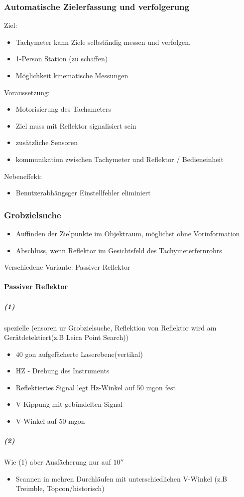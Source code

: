 \documentclass[12pt]{article}
\begin{document}
\subsubsection{Automatische Zielerfassung und verfolgerung}
Ziel:
\begin{itemize}
	\item Tachymeter kann Ziele selbständig messen und verfolgen.
	\item 1-Person Station (zu schaffen)
	\item Möglichkeit kinematische Messungen
\end{itemize}
Voraussetzung:
\begin{itemize}
	\item Motorisierung des Tachameters
	\item Ziel muss mit Reflektor signalisiert sein
	\item zusätzliche Sensoren
	\item kommunikation zwischen Tachymeter und Reflektor / Bedieneinheit
\end{itemize}
Nebeneffekt:
\begin{itemize}
	\item Benutzerabhängsger Einstellfehler eliminiert
\end{itemize}
\subsubsection{Grobzielsuche}
\begin{itemize}
	\item Auffinden der Zielpunkte im Objektraum, möglichst ohne Vorinformation
	\item Abschluss, wenn Reflektor im Gesichtsfeld des Tachymeterfernrohrs
\end{itemize}
Verschiedene Variante: \newline
Passiver Reflektor
\paragraph{Passiver Reflektor}
\subparagraph{(1)}
spezielle (ensoren ur Grobzielsuche, Reflektion von Reflektor wird am Gerätdetektiert(z.B Leica Point Search))
\begin{itemize}
	\item 40 gon aufgefächerte Laserebene(vertikal)
	\item HZ - Drehung des Instruments
	\item Reflektiertes Signal legt Hz-Winkel auf 50 mgon fest
	\item V-Kippung mit gebündelten Signal
	\item V-Winkel auf 50 mgon
\end{itemize}
\subparagraph{(2)}
Wie (1) aber Ausfächerung nur auf $10''$
\begin{itemize}
	\item Scannen in mehren Durchläufen mit unterschiedlichen V-Winkel (z.B Treimble, Topcon/historisch)
\end{itemize}
\end{document}
